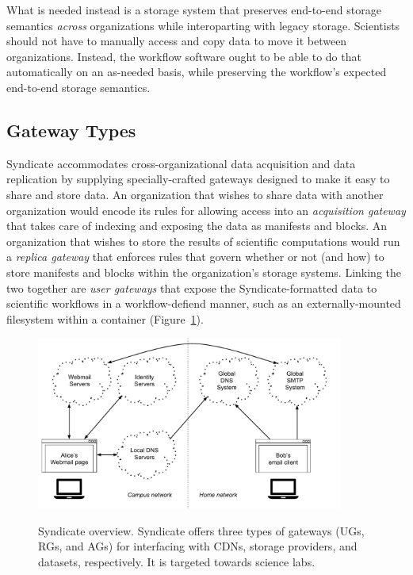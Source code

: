 What is needed instead is a storage system that preserves end-to-end storage
semantics \emph{across} organizations while interoparting with legacy storage.
Scientists should not have to manually access and copy data to move it between
organizations.  Instead, the workflow
software ought to be able to do that automatically on an as-needed basis,
while preserving the workflow's expected end-to-end storage semantics.

\subsection{Gateway Types}

Syndicate accommodates cross-organizational data acquisition and
data replication by supplying specially-crafted gateways designed to make it
easy to share and store data.  An organization that wishes to share data with
another organization would encode its rules for allowing access into an
\emph{acquisition gateway} that takes care of indexing and exposing the data as
manifests and blocks.  An organization that wishes to store the results of
scientific computations would run a \emph{replica gateway} that enforces rules
that govern whether or not (and how) to store manifests and blocks within the
organization's storage systems.  Linking the two together are \emph{user
gateways} that expose the Syndicate-formatted data to scientific workflows in a
workflow-defiend manner, such as an externally-mounted filesystem within a
container (Figure~\ref{fig:chap3-syndicate-overview}).

\begin{figure}[h]
   \caption{Syndicate overview.  Syndicate offers three types of gateways (UGs,
   RGs, and AGs) for interfacing with CDNs, storage providers, and datasets,
   respectively.  It is targeted towards science labs.}
   \centering
   \includegraphics[width=0.9\textwidth,page=20]{figures/dissertation-figures}
   \label{fig:chap3-syndicate-overview}
\end{figure}

